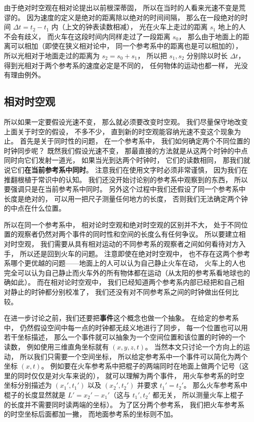 由于绝对时空观在相对论提出以前根深蒂固， 所以在当时的人看来光速不变是荒谬的。 因为速度的定义是绝对的距离除以绝对的时间间隔， 那么在一段绝对的时间 $\Delta t = t_2 - t_1$ 内（上文的钟表读数相减）， 光在火车上走过的距离 $s_1$ 地上的人不会有歧义， 而火车在这段时间内同样走过了一段距离 $s_0$， 那么由于地面上的距离可以相加（即使在狭义相对论中， 同一个参考系中的距离也是可以相加的）， 所以光相对于地面走过的距离为 $s_2 = s_0 + s_1$， 所以把 $s_1, s_2$ 分别除以时长 $\Delta t$， 得到光相对于两个参考系的速度必定是不同的， 任何物体的运动也都一样， 光没有理由例外。

\subsection{相对时空观}
所以如果一定要假设光速不变， 那么就必须要改变时空观。 我们尽量保守地改变上面关于时空的假设， 不多不少， 直到新的时空观能容纳光速不变这个现象为止。 首先是关于同时性的问题， 在一个参考系中， 我们如何确定两个不同位置的时钟同步呢？ 既然我们假设光速不变， 那最直接的方法就是从这两个时钟的中点同时向它们发射一道光， 如果当光到达两个时钟时， 它们的读数相同， 那我们就说它们\textbf{在当前参考系中同时}。 注意我们在使用文字时必须非常谨慎， 因为我们在推翻根植于常识中的认知。 我们还没开始讨论别的参考系中观察到的东西， 所以要强调只是在当前参考系中同时。 另外这个过程中我们还假设了同一个参考系中长度是绝对的， 可以用一把尺子测量任何地方的长度， 否则我们无法确定两个钟的中点在什么位置。

所以在同一个参考系中， 相对论时空观和绝对时空观的区别并不大， 处于不同位置的观察者仍然对两个事件的同时性和空间的长度么有任何争议。 所以要建立相对时空观， 我们需要从具有相对运动的不同参考系的观察者之间如何看待对方入手， 所以还是回到火车的问题。 注意即使在绝对时空观中， 也不存在这两个参考系哪个更优越的问题——地面上的人可以认为自己静止火车在动， 火车上的人也完全可以认为自己静止而火车外的所有物体都在运动（从太阳的参考系看地球也的确如此）。 而在相对论时空观中， 我们已经知道两个参考系内部已经把和自己相对静止的时钟都分别校准了， 我们还没有对不同参考系之间的时钟做出任何比较。

在进一步讨论之前，我们还要把\textbf{事件}这个概念也做一个抽象。 在给定的参考系中， 仍然假设空间中每一点的时钟都无歧义地进行了同步， 每一个位置也可以用若干坐标描述， 那么一个事件就可以抽象为一个空间位置和该位置的时钟的一个读数， 例如使用三维直角坐标就有 $(x, y, z, t)$。 当然本文只讨论一个方向上的运动， 所以我们只需要一个空间坐标， 所以给定参考系中一个事件可以简化为两个坐标 $(x, t)$。 例如要在火车参考系中把棍子的两端同时在地面上做两个记号（这里的同时仅仅是对火车来说的）， 就可以理解为两个事件， 用火车参考系的时空坐标分别描述为 $(x_1', t_1')$ 以及 $(x_2', t_2')$ 并要求 $t_1' = t_2'$。 那么火车参考系中棍子的长度显然就是 $L' = x_2' - x_1'$（这与 $t_1', t_2'$ 都无关， 所以测量火车上棍子的长度并不需要同时读两端的坐标）。 为了区分两个参考系， 我们把火车参考系的时空坐标后面都加一撇， 而地面参考系的坐标则不加。

